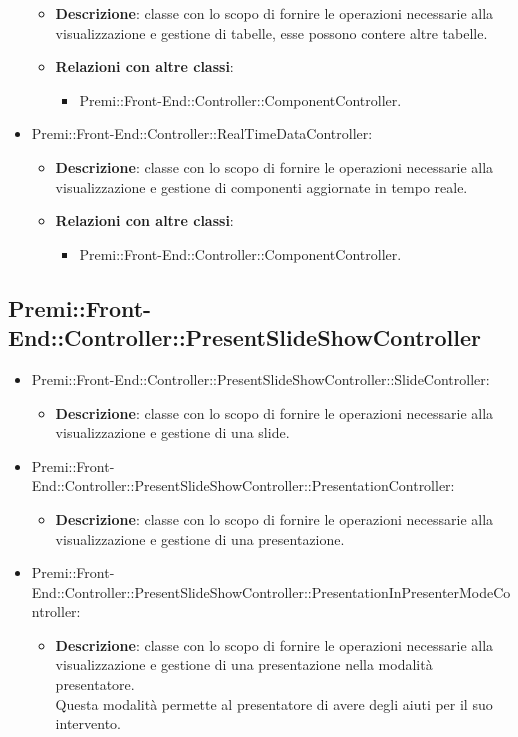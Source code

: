 \begin{itemize}
\begin{itemize}
				\item \textbf{Descrizione}: classe con lo scopo di fornire le operazioni necessarie alla visualizzazione e gestione di tabelle, esse possono contere altre tabelle.
				\item \textbf{Relazioni con altre classi}:
				\begin{itemize}
					\item Premi::Front-End::Controller::ComponentController.
				\end{itemize}
			\end{itemize}
		\item  Premi::Front-End::Controller::RealTimeDataController: 
			 \begin{itemize}
				\item \textbf{Descrizione}: classe con lo scopo di fornire le operazioni necessarie alla visualizzazione e gestione di componenti aggiornate in tempo reale.
				\item \textbf{Relazioni con altre classi}:
				\begin{itemize}
					\item Premi::Front-End::Controller::ComponentController.
				\end{itemize}
			\end{itemize}
			
		\end{itemize}
\subsection{Premi::Front-End::Controller::PresentSlideShowController}
	\begin{itemize}
		 \item Premi::Front-End::Controller::PresentSlideShowController::SlideController:
			\begin{itemize}
				\item \textbf{Descrizione}: classe con lo scopo di fornire le operazioni necessarie alla visualizzazione e gestione di una slide.
			\end{itemize}
		\item  Premi::Front-End::Controller::PresentSlideShowController::PresentationController: 
			 \begin{itemize}
				\item \textbf{Descrizione}: classe con lo scopo di fornire le operazioni necessarie alla visualizzazione e gestione di una presentazione.
			\end{itemize}
		\item Premi::Front-End::Controller::PresentSlideShowController::PresentationInPresenterModeController:
			\begin{itemize}
				\item \textbf{Descrizione}: classe con lo scopo di fornire le operazioni necessarie alla visualizzazione e gestione di una presentazione nella modalità presentatore. 
				\\Questa modalità permette al presentatore di avere degli aiuti per il suo intervento.
			\end{itemize}
	\end{itemize}
	
